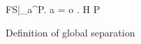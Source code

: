 \begin{figure}
  {\forall FS|_a^\iota \in P. \: a = \ocap \implies \forall o \in {}. \:  }
  {H \vdash P \tsep \gsep}

  \caption{Definition of global separation}
  \label{fig:def_gsep}
\end{figure}





